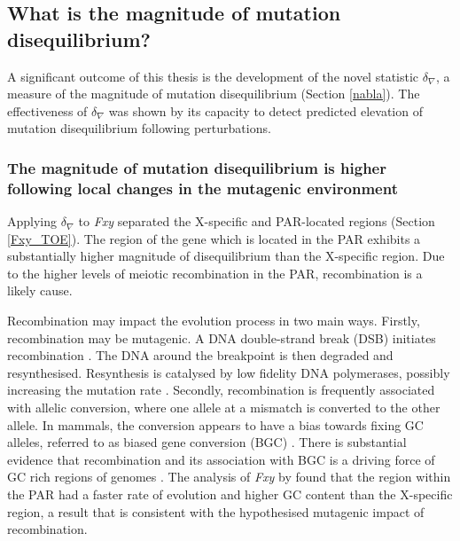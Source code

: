 \subsection{What is the magnitude of mutation disequilibrium?}

A significant outcome of this thesis is the development of the novel statistic $\delta_\nabla$, a measure of the magnitude of mutation disequilibrium (Section \ref{nabla}). The effectiveness of $\delta_\nabla$ was shown by its capacity to detect predicted elevation of mutation disequilibrium following perturbations. 

\subsubsection{The magnitude of mutation disequilibrium is higher following local changes in the mutagenic environment}

Applying $\delta_\nabla$ to \textit{Fxy} separated the X-specific and PAR-located regions (Section \ref{Fxy_TOE}). The region of the gene which is located in the PAR exhibits a substantially higher magnitude of disequilibrium than the X-specific region. Due to the higher levels of meiotic recombination in the PAR, recombination is a likely cause. 

Recombination may impact the evolution process in two main ways. Firstly, recombination may be mutagenic. A DNA double-strand break (DSB) initiates recombination \citep{Keeney2001MechanismInitiation}. The DNA around the breakpoint is then degraded and resynthesised. Resynthesis is catalysed by low fidelity DNA polymerases, possibly increasing the mutation rate \citep{Rattray2003Error-proneAhead}. Secondly, recombination is frequently associated with allelic conversion, where one allele at a mismatch is converted to the other allele. In mammals, the conversion appears to have a bias towards fixing GC alleles, referred to as biased gene conversion (BGC) \citep{Birdsell2002IntegratingEvolution, Eyre-Walker1999EvidenceDNA., Mancera2008High-resolutionYeast}. There is substantial evidence that recombination and its association with BGC is a driving force of GC rich regions of genomes \citep{Meunier2004RecombinationGenome, Berglund2009HotspotsGenes,Galtier2009GC-biasedPrimates}. The analysis of \textit{Fxy} by \cite{Montoya-Burgos2003RecombinationGenomes} found that the region within the PAR had a faster rate of evolution and higher GC content than the X-specific region, a result that is consistent with the hypothesised mutagenic impact of recombination. 

